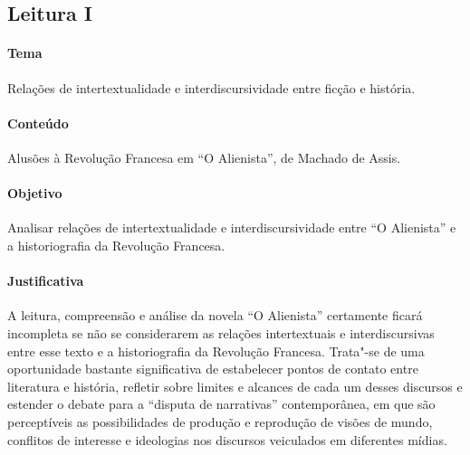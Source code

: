 \documentclass{extarticle}
\begin{document}
\subsection{Leitura I}


\paragraph{Tema} Relações de intertextualidade e interdiscursividade entre
ficção e história.

\paragraph{Conteúdo} Alusões à Revolução Francesa em ``O Alienista'', de
Machado de Assis.

\paragraph{Objetivo} Analisar relações de intertextualidade e
interdiscursividade entre ``O Alienista'' e a historiografia da
Revolução Francesa.

\paragraph{Justificativa} A leitura, compreensão e análise da novela ``O
Alienista'' certamente ficará incompleta se não se considerarem as
relações intertextuais e interdiscursivas entre esse texto e a
historiografia da Revolução Francesa. Trata"-se de uma oportunidade
bastante significativa de estabelecer pontos de contato entre literatura
e história, refletir sobre limites e alcances de cada um desses
discursos e estender o debate para a ``disputa de narrativas''
contemporânea, em que são perceptíveis as possibilidades de produção e
reprodução de visões de mundo, conflitos de interesse e ideologias nos
discursos veiculados em diferentes mídias.
\end{document}
